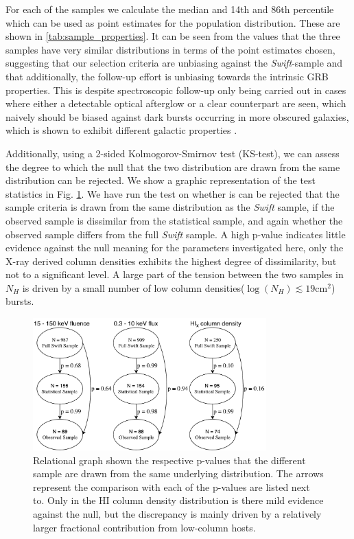 \documentclass{aa}    %
\begin{document}
For each of the samples we calculate the median and 14th and 86th percentile
which can be used as point estimates for the population distribution. These are
shown in \ref{tab:sample_properties}. It can be seen from the values that the
three samples have very similar distributions in terms of the point estimates
chosen, suggesting that our selection criteria are unbiasing against the
\textit{Swift}-sample and that additionally, the follow-up effort is unbiasing
towards the intrinsic GRB properties. This is despite spectroscopic follow-up
only being carried out in cases where either a detectable optical afterglow or a
clear counterpart are seen, which naively should be biased against dark bursts
occurring in more obscured galaxies, which is shown to exhibit different
galactic properties \citep{Perley2009, Kruhler2011, Rossi2012, Perley2013b,
	Perley2015b}.

Additionally, using a 2-sided Kolmogorov-Smirnov test (KS-test), we can assess
the degree to which the null that the two distribution are drawn from the same
distribution can be rejected. We show a graphic representation of the test
statistics in Fig. \ref{fig:p_values}. We have run the test on whether is can be
rejected that the sample criteria is drawn from the same distribution as the
\textit{Swift} sample, if the observed sample is dissimilar from the statistical
sample, and again whether the observed sample differs from the full
\textit{Swift} sample. A high p-value indicates little evidence against the null
meaning for the parameters investigated here, only the X-ray derived column
densities exhibits the highest degree of dissimilarity, but not to a significant
level. A large part of the tension between the two samples in $N_H$ is driven by
a small number of low column densities($\log(N_H) \lesssim 19 \mathrm{cm}^2$)
bursts.

\begin{figure}
	\centerline{\includegraphics[width=9cm]{figures/XSGRB_p_values.pdf}}
	\caption{Relational graph shown the respective p-values that the different
	sample are drawn from the same underlying distribution. The arrows represent
	the comparison with each of the p-values are listed next to. Only in the HI
	column density distribution is there mild evidence against the null, but the
	discrepancy is mainly driven by a relatively larger fractional contribution
	from low-column hosts.}
	\label{fig:p_values}
\end{figure}
\end{document}

